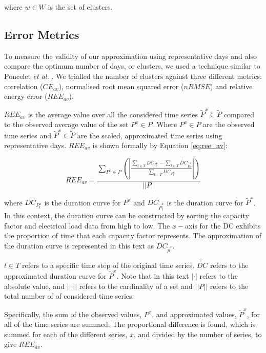 \noindent where $w\in W$ is the set of clusters.

\subsection{Error Metrics}

To measure the validity of our approximation using representative days and also compare the optimum number of days, or clusters, we used a technique similar to Poncelet \textit{et al.} \cite{Dhaeseleer2015, Poncelet2017}. We trialled the number of clusters against three different metrics: correlation ($CE_{av}$), normalised root mean squared error ($nRMSE$) and relative energy error ($REE_{av}$). 

$REE_{av}$ is the average value over all the considered time series $\widetilde{P}^x{\in} \widetilde{P}$ compared to the observed average value of the set $P^x\in P$. Where $P^x\in P$ are the observed time series and $\widetilde{P}^x{\in} \widetilde{P}$ are the scaled, approximated time series using representative days. $REE_{av}$ is shown formally by Equation \ref{eq:ree_av}:


\begin{equation}
\label{eq:ree_av}
REE_{av}=\frac
{\sum\limits_{P^x{\in} P}\left(\left|
	\frac
	{\sum\limits_{t\in T}DC_{P^x_t}-\sum\limits_{t\in T}\widetilde{DC}_{\widetilde{P}^x_t}}
	{\sum\limits_{t\in T}DC_{P^x_t}}
	\right|\right)
}
{\left|\left|P\right|\right|}
\end{equation}

\noindent where $DC_{P^x_t}$ is the duration curve for $P^x$ and $DC_{\widetilde{P}^x_t}$ is the duration curve for $\widetilde{P}^x$. In this context, the duration curve can be constructed by sorting the capacity factor and electrical load data from high to low. The $x-$axis for the DC exhibits the proportion of time that each capacity factor represents. The approximation of the duration curve is represented in this text as $\widetilde{DC}_{\widetilde{p}^x}$.

$t\in T$ refers to a specific time step of the original time series. $\widetilde{DC}$ refers to the approximated duration curve for $\widetilde{P}^x$. Note that in this text $\left|\cdot\right|$ refers to the absolute value, and $\left|\left|\cdot\right|\right|$ refers to the cardinality of a set and $\left|\left|P\right|\right|$ refers to the total number of of considered time series.

Specifically, the sum of the observed values, $P^x$, and approximated values, $\widetilde P^x$, for all of the time series are summed. The proportional difference is found, which is summed for each of the different series, $x$, and divided by the number of series, to give $REE_{av}$.





